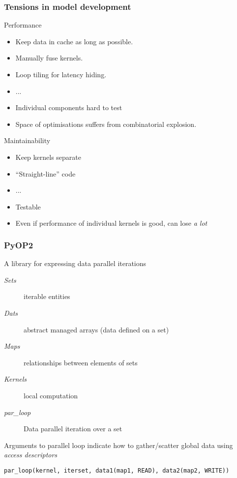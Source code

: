 \documentclass[presentation]{beamer}
\begin{document}
\begin{frame}[allowframebreaks]
  \frametitle{Tensions in model development}

  \begin{block}{Performance}
    \begin{itemize}
    \item Keep data in cache as long as possible.  
    \item Manually fuse kernels.
    \item Loop tiling for latency hiding.
    \item ...
    \item Individual components hard to test
    \item Space of optimisations suffers from combinatorial
      explosion.
    \end{itemize}
  \end{block}

\pagebreak
  \begin{block}{Maintainability}
    \begin{itemize}
    \item Keep kernels separate
    \item ``Straight-line'' code
    \item ...
    \item Testable
    \item Even if performance of individual kernels is good, can lose
      \emph{a lot}
    \end{itemize}
  \end{block}

\end{frame}

\begin{frame}[fragile]
  \frametitle{PyOP2}
  A library for expressing data parallel iterations
\begin{description}
\item[{\emph{Sets}}] iterable entities
\item[{\emph{Dats}}] abstract managed arrays (data defined on a set)
\item[{\emph{Maps}}] relationships between elements of sets
\item[{\emph{Kernels}}] local computation
\item[{\emph{par\_loop}}] Data parallel iteration over a set
\end{description}
Arguments to parallel loop indicate how to gather/scatter global
data using \emph{access descriptors}

\begin{verbatim}
par_loop(kernel, iterset, data1(map1, READ), data2(map2, WRITE))
\end{verbatim}
\end{frame}
\end{document}
